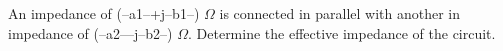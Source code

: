 \question An impedance of (--a1--+j--b1--) $\Omega$ is connected in parallel with another in impedance of (--a2---j--b2--) $\Omega$. Determine the effective impedance of the circuit.
\answerline